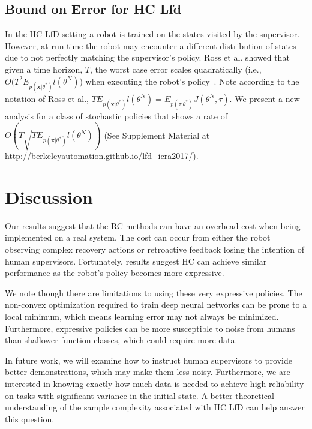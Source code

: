 \documentclass[10pt, conference]{ieeeconf}      %
\newcommand{\bx}{\mathbf{x}}
\begin{document}
\subsection{Bound on Error for HC Lfd}
In the HC LfD setting a robot is trained on the states visited by the supervisor. However, at run time the robot may encounter a different distribution of states due to not perfectly matching the supervisor's policy. Ross et al. showed that given a time horizon, $T$, the worst case error scales quadratically (i.e., $O(T^2E_{p(\bx|\theta^*)} l(\theta^N)$) when executing the robot's policy~\cite{ross2010efficient}. Note according to the notation of Ross et al., $TE_{p(\bx|\theta^*)} l(\theta^N) = E_{p(\tau|\theta^*)} J(\theta^N, \tau)$. We present a new analysis for a class of stochastic policies that shows a rate of $O(T\sqrt{TE_{p(\bx|\theta^*)} l(\theta^N)})$ (See Supplement Material at \url{http://berkeleyautomation.github.io/lfd_icra2017/}).  


\section{Discussion}
 Our results suggest that the RC methods can have an overhead cost when being implemented on a real system. The cost can occur from either the robot observing complex recovery actions or retroactive feedback losing the intention of human supervisors. Fortunately, results suggest HC can achieve similar performance as the robot's policy becomes more expressive. 

We note though there are limitations to using these very expressive policies. The non-convex optimization required to train deep neural networks can be prone to a local minimum, which means learning error may not always be minimized. Furthermore, expressive policies can be more susceptible to noise from humans than shallower function classes, which could require more data. 

In future work, we will examine how to instruct human supervisors to provide better demonstrations, which may make them less noisy. Furthermore, we are interested in knowing exactly how much data is needed to achieve high reliability on tasks with significant variance in the initial state. A better theoretical understanding of the sample complexity associated with HC LfD can help answer this question. 






\end{document}
